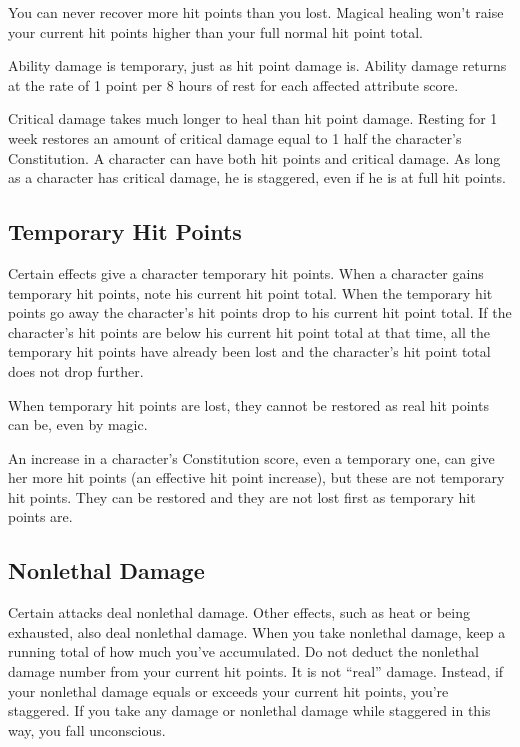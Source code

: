  You can never recover more hit points than you lost. Magical healing won't raise your current hit points higher than your full normal hit point total.

 Ability damage is temporary, just as hit point damage is. Ability damage returns at the rate of 1 point per 8 hours of rest for each affected attribute score.

 Critical damage takes much longer to heal than hit point damage. Resting for 1 week restores an amount of critical damage equal to 1 \add half the character's Constitution. A character can have both hit points and critical damage. As long as a character has critical damage, he is staggered, even if he is at full hit points.

\subsection{Temporary Hit Points}
Certain effects give a character temporary hit points. When a character gains temporary hit points, note his current hit point total. When the temporary hit points go away the character's hit points drop to his current hit point total. If the character's hit points are below his current hit point total at that time, all the temporary hit points have already been lost and the character's hit point total does not drop further.

When temporary hit points are lost, they cannot be restored as real hit points can be, even by magic.

 An increase in a character's Constitution score, even a temporary one, can give her more hit points (an effective hit point increase), but these are not temporary hit points. They can be restored and they are not lost first as temporary hit points are.

\subsection{Nonlethal Damage}
 Certain attacks deal nonlethal damage. Other effects, such as heat or being exhausted, also deal nonlethal damage. When you take nonlethal damage, keep a running total of how much you've accumulated. Do not deduct the nonlethal damage number from your current hit points. It is not ``real'' damage. Instead, if your nonlethal damage equals or exceeds your current hit points, you're staggered. If you take any damage or nonlethal damage while staggered in this way, you fall unconscious.

